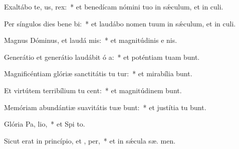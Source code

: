 \item Exaltábo te,  us, rex:~* et benedícam nómini tuo in sǽculum, et in  culi.
\item Per síngulos dies bene bi:~* et laudábo nomen tuum in sǽculum, et in  culi.
\item Magnus Dóminus, et laudá mis:~* et magnitúdinis e   nis.
\item Generátio et generátio laudábit ó a:~* et poténtiam tuam bunt.
\item Magnificéntiam glóriæ sanctitátis tu tur:~* et mirabília  bunt.
\item Et virtútem terribílium tu cent:~* et magnitúdinem  bunt.
\item Memóriam abundántiæ suavitátis tuæ bunt:~* et justítia tu bunt.
\item Glória Pa,  lio,~* et Spi to.
\item Sicut erat in princípio, et ,  per,~* et in sǽcula sæ. men.
